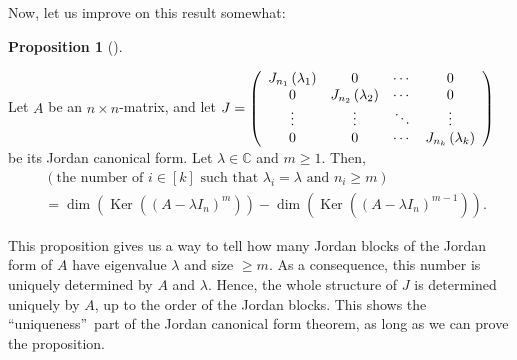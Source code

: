 \documentclass[numbers=enddot,12pt,final,onecolumn,notitlepage]{scrartcl}%
\numberwithin{exer}{subsection}
\theoremstyle{definition}
\newtheorem{prop}[theo]{Proposition}
\newenvironment{proposition}[1][]
{\begin{prop}[#1]\begin{leftbar}}
{\end{leftbar}\end{prop}}
\begin{document}
Now, let us improve on this result somewhat:

\begin{proposition}
Let $A$ be an $n\times n$-matrix, and let $J=\left(
\begin{array}
[c]{cccc}%
J_{n_{1}}\left(  \lambda_{1}\right)   & 0 & \cdots & 0\\
0 & J_{n_{2}}\left(  \lambda_{2}\right)   & \cdots & 0\\
\vdots & \vdots & \ddots & \vdots\\
0 & 0 & \cdots & J_{n_{k}}\left(  \lambda_{k}\right)
\end{array}
\right)  $ be its Jordan canonical form. Let $\lambda\in\mathbb{C}$ and
$m\geq1$. Then,%
\begin{align*}
& \left(  \text{the number of }i\in\left[  k\right]  \text{ such that }%
\lambda_{i}=\lambda\text{ and }n_{i}\geq m\right)  \\
& =\dim\left(  \operatorname*{Ker}\left(  \left(  A-\lambda I_{n}\right)
^{m}\right)  \right)  -\dim\left(  \operatorname*{Ker}\left(  \left(
A-\lambda I_{n}\right)  ^{m-1}\right)  \right)  .
\end{align*}

\end{proposition}

This proposition gives us a way to tell how many Jordan blocks of the Jordan
form of $A$ have eigenvalue $\lambda$ and size $\geq m$. As a consequence,
this number is uniquely determined by $A$ and $\lambda$. Hence, the whole
structure of $J$ is determined uniquely by $A$, up to the order of the Jordan
blocks. This shows the \textquotedblleft uniqueness\textquotedblright\ part of
the Jordan canonical form theorem, as long as we can prove the proposition.
\end{document}
